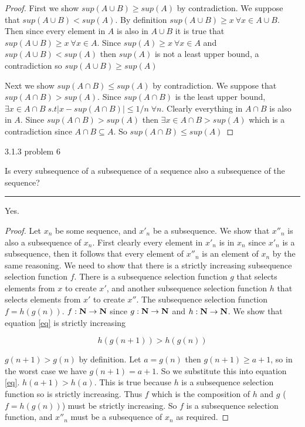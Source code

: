 \documentclass[11pt]{article}
\begin{document}
\begin{proof}

First we show $sup(A \cup B) \geq sup (A)$ by contradiction. We suppose that $sup(A \cup B) < sup(A)$. By definition $sup(A \cup B) \geq x \: \forall x \in A \cup B$. Then since every element in $A$ is also in $A \cup B$ it is true that $sup(A \cup B) \geq x \: \forall x \in A$. Since $sup(A) \geq x \: \forall x \in A$ and $sup(A \cup B) < sup(A)$ then $sup(A)$ is not a least upper bound, a contradiction so $sup(A \cup B) \geq sup(A)$

Next we show $sup(A \cap B) \leq sup(A)$ by contradiction. We suppose that $sup(A \cap B) > sup(A)$. Since $sup(A \cap B)$ is the least upper bound, $\exists x \in A \cap B \; s.t |x - sup(A \cap B)| \leq 1/n \; \forall n$. Clearly everything in $A \cap B$ is also in $A$. Since $sup(A \cap B) > sup(A)$ then $\exists x \in A \cap B > sup(A)$ which is a contradiction since $A \cap B \subseteq A$. So $sup(A \cap B) \leq sup(A)$

\end{proof}








\newpage
{} 3.1.3 problem 6

Is every subsequence of a subsequence of a sequence also a subsequence of the sequence?
\hrule

Yes. 

\begin{proof}

Let $x_n$ be some sequence, and $x'_n$ be a subsequence. We show that $x''_n$ is also a subsequence of $x_n$. First clearly every element in $x'_n$ is in $x_n$ since $x'_n$ is a subsequence, then it follows that every element of $x''_n$ is an element of $x_n$ by the same reasoning. We need to show that there is a strictly increasing subsequence selection function $f$. There is a subsequence selection function $g$ that selects elements from $x$ to create $x'$, and another subsequence selection function $h$ that selects elements from $x'$ to create $x''$. The subsequence selection function $f = h(g(n))$. $f: \mathbf{N} \to \mathbf{N}$ since $g: \mathbf{N} \to \mathbf{N}$ and $h: \mathbf{N} \to \mathbf{N}$. We show that equation \ref{eq} is strictly increasing 

\begin{equation}
\label{eq}
h(g(n+1)) > h(g(n))
\end{equation}

$g(n+1) > g(n)$ by definition. Let $a = g(n)$ then $g(n+1) \geq a + 1$, so in the worst case we have $g(n+1) = a + 1$. So we substitute this into equation \ref{eq}. $h(a + 1) > h(a)$. This is true because $h$ is a subsequence selection function so is strictly increasing. Thus $f$ which is the composition of $h$ and $g$ ($f = h(g(n))$) must be strictly increasing. So $f$ is a subsequence selection function, and $x''_n$ must be a subsequence of $x_n$ as required.  

\end{proof}
\end{document}

